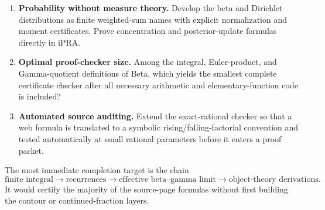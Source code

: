 \begin{enumerate}
\item \textbf{Probability without measure theory.}
Develop the beta and Dirichlet distributions as finite weighted-sum names with explicit normalization and moment certificates.  Prove concentration and posterior-update formulas directly in iPRA.

\item \textbf{Optimal proof-checker size.}
Among the integral, Euler-product, and Gamma-quotient definitions of Beta, which yields the smallest complete certificate checker after all necessary arithmetic and elementary-function code is included?

\item \textbf{Automated source auditing.}
Extend the exact-rational checker so that a web formula is translated to a symbolic rising/falling-factorial convention and tested automatically at small rational parameters before it enters a proof packet.
\end{enumerate}

The most immediate completion target is the chain
\[
 \text{finite integral}
 \longrightarrow
 \text{recurrences}
 \longrightarrow
 \text{effective beta--gamma limit}
 \longrightarrow
 \text{object-theory derivations}.
\]
It would certify the majority of the source-page formulas without first building the contour or continued-fraction layers.
